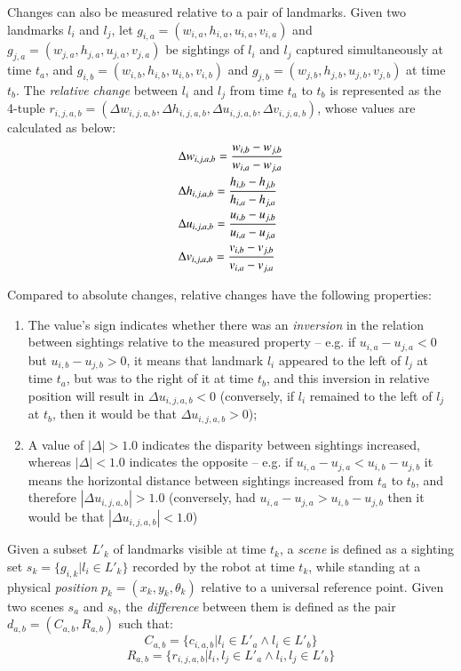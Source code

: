\documentclass[twocolumn, 9pt]{jsproceedings}
\begin{document}
Changes can also be measured relative to a pair of landmarks. Given two landmarks \(l_i\) and \(l_j\), let \(g_{i,a} = (w_{i,a}, h_{i,a}, u_{i,a}, v_{i,a})\) and \(g_{j,a} = (w_{j,a}, h_{j,a}, u_{j,a}, v_{j,a})\) be sightings of \(l_i\) and \(l_j\) captured simultaneously at time \(t_a\), and \(g_{i,b} = (w_{i,b}, h_{i,b}, u_{i,b}, v_{i,b})\) and \(g_{j,b} = (w_{j,b}, h_{j,b}, u_{j,b}, v_{j,b})\) at time \(t_b\). The {\it relative change} between \(l_i\) and \(l_j\) from time \(t_a\) to \(t_b\) is represented as the 4-tuple \(r_{i,j,a,b} = (\Delta w_{i,j,a,b}, \Delta h_{i,j,a,b}, \Delta u_{i,j,a,b}, \Delta v_{i,j,a,b})\), whose values are calculated as below:
\begin{align}
& \Delta w_{i,j,a,b} = \frac{w_{i,b} - w_{j,b}}{w_{i,a} - w_{j,a}} \\
& \Delta h_{i,j,a,b} = \frac{h_{i,b} - h_{j,b}}{h_{i,a} - h_{j,a}} \notag\\
& \Delta u_{i,j,a,b} = \frac{u_{i,b} - u_{j,b}}{u_{i,a} - u_{j,a}} \notag\\
& \Delta v_{i,j,a,b} = \frac{v_{i,b} - v_{j,b}}{v_{i,a} - v_{j,a}} \notag
\end{align}

Compared to absolute changes, relative changes have the following properties:

\begin{enumerate}
\item The value's sign indicates whether there was an {\it inversion} in the relation between sightings relative to the measured property -- e.g. if \(u_{i,a} - u_{j,a} < 0\) but \(u_{i,b} - u_{j,b} > 0\), it means that landmark \(l_i\) appeared to the left of \(l_j\) at time \(t_a\), but was to the right of it at time \(t_b\), and this inversion in relative position will result in \(\Delta u_{i,j,a,b} < 0\) (conversely, if \(l_i\) remained to the left of \(l_j\) at \(t_b\), then it would be that \(\Delta u_{i,j,a,b} > 0\));
\item A value of \(|\Delta| > 1.0\) indicates the disparity between sightings increased, whereas \(|\Delta| < 1.0\) indicates the opposite -- e.g. if \(u_{i,a} - u_{j,a} < u_{i,b} - u_{j,b}\) it means the horizontal distance between sightings increased from \(t_a\) to  \(t_b\), and therefore \(|\Delta u_{i,j,a,b}| > 1.0\) (conversely, had \(u_{i,a} - u_{j,a} > u_{i,b} - u_{j,b}\) then it would be that \(|\Delta u_{i,j,a,b}| < 1.0\))
\end{enumerate}

Given a subset \(L'_k\) of landmarks visible at time \(t_k\), a {\it scene} is defined as a sighting set \(s_k = \{g_{i,k} | l_i \in L'_k\}\) recorded by the robot at time \(t_k\), while standing at a physical {\it position} \(p_k = (x_k, y_k, \theta_k)\) relative to a universal reference point. Given two scenes \(s_a\) and \(s_b\), the {\it difference} between them is defined as the pair \(d_{a,b} = (C_{a,b}, R_{a,b})\) such that:
\begin{equation}
C_{a,b} = \{c_{i,a,b} | l_i \in L'_a \land l_i \in L'_b \}
\end{equation}
\begin{equation}
R_{a,b} = \{r_{i,j,a,b} | l_i, l_j \in L'_a \land l_i, l_j \in L'_b \}
\end{equation}
\end{document}
